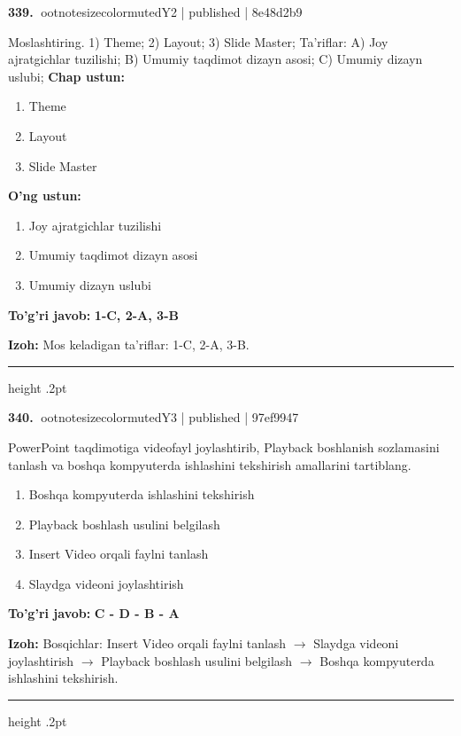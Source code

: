 \documentclass[10pt,a4paper]{article}
\begin{document}
\textbf{\color{ink}339.} {ootnotesizecolor{muted}Y2 | published | 8e48d2b9}
\par
Moslashtiring.  1) Theme;  2) Layout;  3) Slide Master;  Ta'riflar: A) Joy ajratgichlar tuzilishi;  B) Umumiy taqdimot dizayn asosi;  C) Umumiy dizayn uslubi;
\textbf{Chap ustun:}\begin{enumerate}[label=\arabic*),leftmargin=9mm]
\item Theme
\item Layout
\item Slide Master
\end{enumerate}
\textbf{O'ng ustun:}\begin{enumerate}[label=\Alph*),leftmargin=9mm]
\item Joy ajratgichlar tuzilishi
\item Umumiy taqdimot dizayn asosi
\item Umumiy dizayn uslubi
\end{enumerate}
\begin{tcolorbox}[enhanced,breakable,colback=teal!4,colframe=teal!55!black,boxrule=0.45pt,arc=1.2mm,left=2.8mm,right=2.8mm,top=2mm,bottom=2mm]
\textbf{\color{teal}To'g'ri javob:} \textbf{1-C, 2-A, 3-B}
\par\smallskip
\textbf{Izoh:} Mos keladigan ta'riflar: 1-C, 2-A, 3-B.
\end{tcolorbox}
\vspace{2mm}\hrule height .2pt\vspace{2mm}

\textbf{\color{ink}340.} {ootnotesizecolor{muted}Y3 | published | 97ef9947}
\par
PowerPoint taqdimotiga videofayl joylashtirib, Playback boshlanish sozlamasini tanlash va boshqa kompyuterda ishlashini tekshirish amallarini tartiblang.
\begin{enumerate}[label=\Alph*),leftmargin=9mm]
\item Boshqa kompyuterda ishlashini tekshirish
\item Playback boshlash usulini belgilash
\item Insert Video orqali faylni tanlash
\item Slaydga videoni joylashtirish
\end{enumerate}
\begin{tcolorbox}[enhanced,breakable,colback=teal!4,colframe=teal!55!black,boxrule=0.45pt,arc=1.2mm,left=2.8mm,right=2.8mm,top=2mm,bottom=2mm]
\textbf{\color{teal}To'g'ri javob:} \textbf{C - D - B - A}
\par\smallskip
\textbf{Izoh:} Bosqichlar: Insert Video orqali faylni tanlash \ensuremath{\rightarrow} Slaydga videoni joylashtirish \ensuremath{\rightarrow} Playback boshlash usulini belgilash \ensuremath{\rightarrow} Boshqa kompyuterda ishlashini tekshirish.
\end{tcolorbox}
\vspace{2mm}\hrule height .2pt\vspace{2mm}
\end{document}
